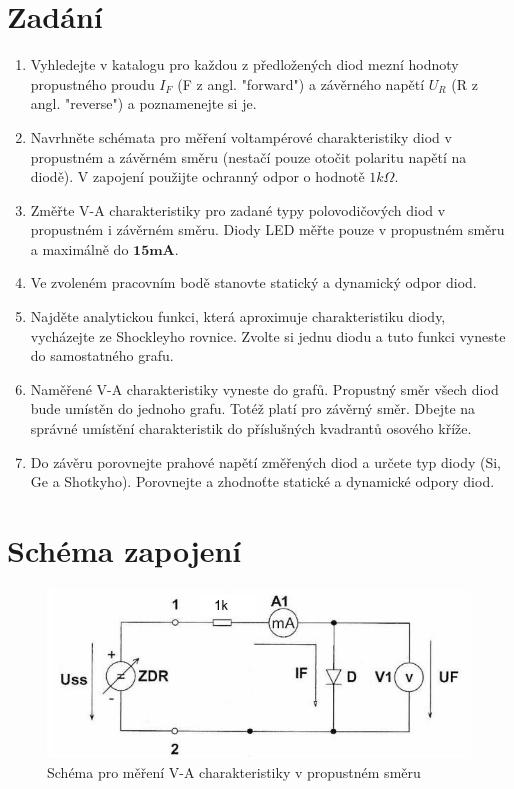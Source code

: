 \documentclass[12pt]{article} %
\begin{document}
\section*{Zadání}
\begin{enumerate}
\item Vyhledejte v katalogu pro každou z předložených diod mezní hodnoty
propustného proudu $I_F$ (F z angl. "forward") a závěrného napětí $U_R$ (R z
angl. "reverse") a poznamenejte si je.
\item Navrhněte schémata pro měření voltampérové charakteristiky diod
v propustném a závěrném směru (nestačí pouze otočit polaritu napětí na
diodě). V zapojení použijte ochranný odpor o hodnotě $1k\Omega$.
\item Změřte V-A charakteristiky pro zadané typy polovodičových diod v
propustném i závěrném směru. Diody LED měřte pouze v propustném směru
a maximálně do $\mathbf{15 mA}$.
\item Ve zvoleném pracovním bodě stanovte statický a dynamický odpor diod.
\item Najděte analytickou funkci, která aproximuje charakteristiku diody,
vycházejte ze Shockleyho rovnice. Zvolte si jednu diodu a tuto funkci vyneste
do samostatného grafu.
\item Naměřené V-A charakteristiky vyneste do grafů. Propustný směr všech diod
bude umístěn do jednoho grafu. Totéž platí pro závěrný směr. Dbejte na
správné umístění charakteristik do příslušných kvadrantů osového kříže.
\item Do závěru porovnejte prahové napětí změřených diod a určete typ diody (Si,
Ge a Shotkyho). Porovnejte a zhodnoťte statické a dynamické odpory diod.
\end{enumerate}

\section*{Schéma zapojení}
\begin{figure}[H]
\includegraphics[scale=1]{propustny.jpg}
\caption{Schéma pro měření V-A charakteristiky v propustném směru}
\end{figure}
\end{document}
